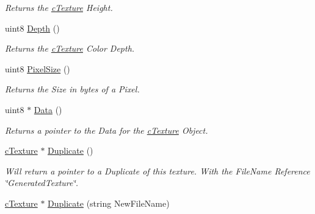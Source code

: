 \begin{DoxyCompactItemize}
\begin{DoxyCompactList}\small\item\em Returns the \hyperlink{classc_texture}{cTexture} Height. \end{DoxyCompactList}\item 
\hypertarget{classc_texture_a164f0382188c58c0bb0c82a90ba53975}{
uint8 \hyperlink{classc_texture_a164f0382188c58c0bb0c82a90ba53975}{Depth} ()}
\label{classc_texture_a164f0382188c58c0bb0c82a90ba53975}

\begin{DoxyCompactList}\small\item\em Returns the \hyperlink{classc_texture}{cTexture} Color Depth. \end{DoxyCompactList}\item 
\hypertarget{classc_texture_a29a9bc66ab0ef6dbc256e4a45c27bdcc}{
uint8 \hyperlink{classc_texture_a29a9bc66ab0ef6dbc256e4a45c27bdcc}{PixelSize} ()}
\label{classc_texture_a29a9bc66ab0ef6dbc256e4a45c27bdcc}

\begin{DoxyCompactList}\small\item\em Returns the Size in bytes of a Pixel. \end{DoxyCompactList}\item 
\hypertarget{classc_texture_a626a980c8c1a84d52b86cfe261531209}{
uint8 $\ast$ \hyperlink{classc_texture_a626a980c8c1a84d52b86cfe261531209}{Data} ()}
\label{classc_texture_a626a980c8c1a84d52b86cfe261531209}

\begin{DoxyCompactList}\small\item\em Returns a pointer to the Data for the \hyperlink{classc_texture}{cTexture} Object. \end{DoxyCompactList}\item 
\hypertarget{classc_texture_a172c2f2b669e00b46c42ae5e8a38c789}{
\hyperlink{classc_texture}{cTexture} $\ast$ \hyperlink{classc_texture_a172c2f2b669e00b46c42ae5e8a38c789}{Duplicate} ()}
\label{classc_texture_a172c2f2b669e00b46c42ae5e8a38c789}

\begin{DoxyCompactList}\small\item\em Will return a pointer to a Duplicate of this texture. With the FileName Reference \char`\"{}GeneratedTexture\char`\"{}. \end{DoxyCompactList}\item 
\hypertarget{classc_texture_a6a1bbd1031f32725ddcbda3942ed93a1}{
\hyperlink{classc_texture}{cTexture} $\ast$ \hyperlink{classc_texture_a6a1bbd1031f32725ddcbda3942ed93a1}{Duplicate} (string NewFileName)}
\label{classc_texture_a6a1bbd1031f32725ddcbda3942ed93a1}


\end{DoxyCompactItemize}
